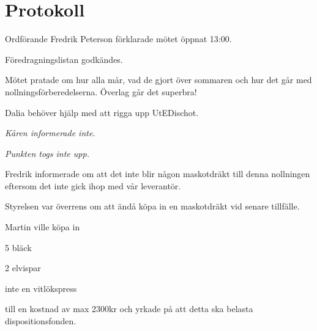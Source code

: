 \documentclass[10pt]{article}
\def\mo{Fredrik Peterson}
\begin{document}
\section*{Protokoll}
\begin{paragrafer}
Ordförande {\mo} förklarade mötet öppnat 13:00.

\valavmo

\valavms

\tosg

\ingaadj

\valavj

Föredragningslistan godkändes.


\begin{fyllnadsval} %
\end{fyllnadsval}

\begin{paragrafer}
Mötet pratade om hur alla mår, vad de gjort över sommaren och hur det går med nollningsförberedelserna. Överlag går det superbra!

Dalia behöver hjälp med att rigga upp UtEDischot.

\emph{Kåren informerade inte.}

\emph{Punkten togs inte upp.}

\end{paragrafer}

Fredrik informerade om att det inte blir någon maskotdräkt till denna nollningen eftersom det inte gick ihop med vår leverantör.

Styrelsen var överrens om att ändå köpa in en maskotdräkt vid senare tillfälle.

Martin ville köpa in
\begin{dashlist}
    \item 5 bläck
    \item 2 elvispar
    \item inte en vitlökspress
\end{dashlist}
till en kostnad av max 2300kr och yrkade på att detta ska belasta dispositionsfonden.


\end{paragrafer}
\end{document}
